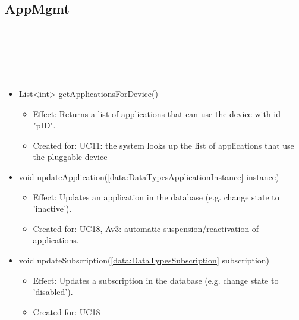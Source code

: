   \subsection{AppMgmt}\label{int:DatabaseDatabaseAppMgmt}
    \begin{description}
      \item[Provided by:] \iconcomponent{}~
      \item[Required by:] \iconcomponent{}~
      \item[Operations:] ~
    \begin{itemize}[noitemsep,nolistsep,leftmargin=-.25cm]
      \item \textsf{List\textless{}int\textgreater{} getApplicationsForDevice()}
        \begin{itemize}[noitemsep,nolistsep]
           \item Effect: Returns a list of applications that can use the device with id "pID".
\item Created for: UC11: the system looks up the list of applications that use the pluggable device
        \end{itemize}
      \item \textsf{void updateApplication(\ref{data:DataTypesApplicationInstance} instance)}
        \begin{itemize}[noitemsep,nolistsep]
           \item Effect: Updates an application in the database (e.g. change state to 'inactive').
\item Created for: UC18, Av3: automatic suspension/reactivation of applications.
        \end{itemize}
      \item \textsf{void updateSubscription(\ref{data:DataTypesSubscription} subscription)}
        \begin{itemize}[noitemsep,nolistsep]
           \item Effect: Updates a subscription in the database (e.g. change state to 'disabled').
\item Created for: UC18
        \end{itemize}
    \end{itemize}
    \end{description}

